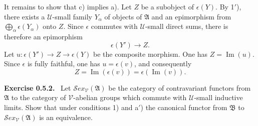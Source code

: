 \documentclass[11pt]{article}
\newcommand{\U}{\mathcal{U}}
\newcommand{\V}{\mathcal{V}}
\newcommand{\A}{\mathfrak{A}}
\newcommand{\B}{\mathfrak{B}}
\newcommand{\Imop}{\operatorname{Im}}
\newcommand{\Sex}{\mathcal{S}\!ex}
\newenvironment{remarktext}[1]{\par\medskip\noindent\textbf{#1.}\ }{\par\medskip}
\begin{document}
It remains to show that c) implies a). Let $Z$ be a subobject of $\epsilon(Y)$. By 1$'$), there exists a $\U$-small family $Y_\alpha$ of objects of $\A$ and an epimorphism from $\bigoplus_\alpha\epsilon(Y_\alpha)$ onto $Z$. Since $\epsilon$ commutes with $\U$-small direct sums, there is therefore an epimorphism
\[
\epsilon(Y')\longrightarrow Z.
\]
Let $u:\epsilon(Y')\to Z\to \epsilon(Y)$ be the composite morphism. One has $Z=\Imop(u)$. Since $\epsilon$ is fully faithful, one has $u=\epsilon(v)$, and consequently
\[
Z=\Imop(\epsilon(v))=\epsilon(\Imop(v)).
\]

\begin{remarktext}{Exercise 0.5.2}
Let $\Sex_{\V}(\A)$ be the category of contravariant functors from $\A$ to the category of $\V$-abelian groups which commute with $\U$-small inductive limits. Show that under conditions 1) and a$'$) the canonical functor from $\B$ to $\Sex_{\V}(\A)$ is an equivalence.
\end{remarktext}
\end{document}
